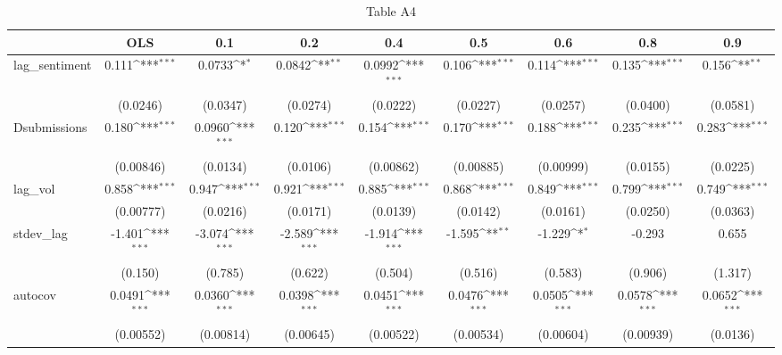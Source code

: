 \begin{table}[htbp]\centering
\def\sym#1{\ifmmode^{#1}\else\(^{#1}\)\fi}
\caption{Table A4}
\begin{tabular}{l*{8}{c}}
\hline\hline
                &\multicolumn{1}{c}{OLS}&\multicolumn{1}{c}{0.1}&\multicolumn{1}{c}{0.2}&\multicolumn{1}{c}{0.4}&\multicolumn{1}{c}{0.5}&\multicolumn{1}{c}{0.6}&\multicolumn{1}{c}{0.8}&\multicolumn{1}{c}{0.9}\\
\hline
lag\_sentiment   &    0.111\sym{***}&   0.0733\sym{*}  &   0.0842\sym{**} &   0.0992\sym{***}&    0.106\sym{***}&    0.114\sym{***}&    0.135\sym{***}&    0.156\sym{**} \\
                & (0.0246)         & (0.0347)         & (0.0274)         & (0.0222)         & (0.0227)         & (0.0257)         & (0.0400)         & (0.0581)         \\
[1em]
Dsubmissions    &    0.180\sym{***}&   0.0960\sym{***}&    0.120\sym{***}&    0.154\sym{***}&    0.170\sym{***}&    0.188\sym{***}&    0.235\sym{***}&    0.283\sym{***}\\
                &(0.00846)         & (0.0134)         & (0.0106)         &(0.00862)         &(0.00885)         &(0.00999)         & (0.0155)         & (0.0225)         \\
[1em]
lag\_vol         &    0.858\sym{***}&    0.947\sym{***}&    0.921\sym{***}&    0.885\sym{***}&    0.868\sym{***}&    0.849\sym{***}&    0.799\sym{***}&    0.749\sym{***}\\
                &(0.00777)         & (0.0216)         & (0.0171)         & (0.0139)         & (0.0142)         & (0.0161)         & (0.0250)         & (0.0363)         \\
[1em]
stdev\_lag       &   -1.401\sym{***}&   -3.074\sym{***}&   -2.589\sym{***}&   -1.914\sym{***}&   -1.595\sym{**} &   -1.229\sym{*}  &   -0.293         &    0.655         \\
                &  (0.150)         &  (0.785)         &  (0.622)         &  (0.504)         &  (0.516)         &  (0.583)         &  (0.906)         &  (1.317)         \\
[1em]
autocov         &   0.0491\sym{***}&   0.0360\sym{***}&   0.0398\sym{***}&   0.0451\sym{***}&   0.0476\sym{***}&   0.0505\sym{***}&   0.0578\sym{***}&   0.0652\sym{***}\\
                &(0.00552)         &(0.00814)         &(0.00645)         &(0.00522)         &(0.00534)         &(0.00604)         &(0.00939)         & (0.0136)         \\

\end{tabular}
\end{table}
